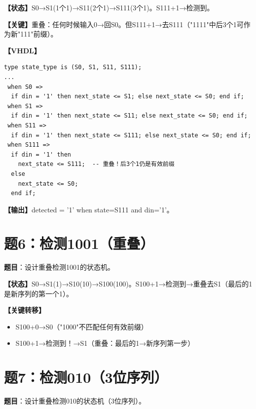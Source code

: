 \begin{solution}[完整解答]

\textbf{【状态】}S0→S1(1个1)→S11(2个1)→S111(3个1)。S111+1→检测到。

\textbf{【关键】}重叠：任何时候输入0→回S0。但S111+1→去S111（"1111"中后3个1可作为新"111"前缀）。

\textbf{【VHDL】}
\begin{lstlisting}
type state_type is (S0, S1, S11, S111);
...
 when S0 =>
  if din = '1' then next_state <= S1; else next_state <= S0; end if;
 when S1 =>
  if din = '1' then next_state <= S11; else next_state <= S0; end if;
 when S11 =>
  if din = '1' then next_state <= S111; else next_state <= S0; end if;
 when S111 =>
  if din = '1' then
    next_state <= S111;  -- 重叠！后3个1仍是有效前缀
  else
    next_state <= S0;
  end if;
\end{lstlisting}

\textbf{【输出】}detected = '1' when state=S111 and din='1'。

\end{solution}


\section{题6：检测1001（重叠）}

\textbf{题目}：设计重叠检测1001的状态机。

\begin{solution}[完整解答]

\textbf{【状态】}S0→S1(1)→S10(10)→S100(100)。S100+1→检测到→重叠去S1（最后的1是新序列的第一个1）。

\textbf{【关键转移】}
\begin{itemize}
  \item S100+0→S0（"1000"不匹配任何有效前缀）
  \item S100+1→检测到！→S1（重叠：最后的1→新序列第一步）
\end{itemize}

\end{solution}


\section{题7：检测010（3位序列）}

\textbf{题目}：设计重叠检测010的状态机（3位序列）。

